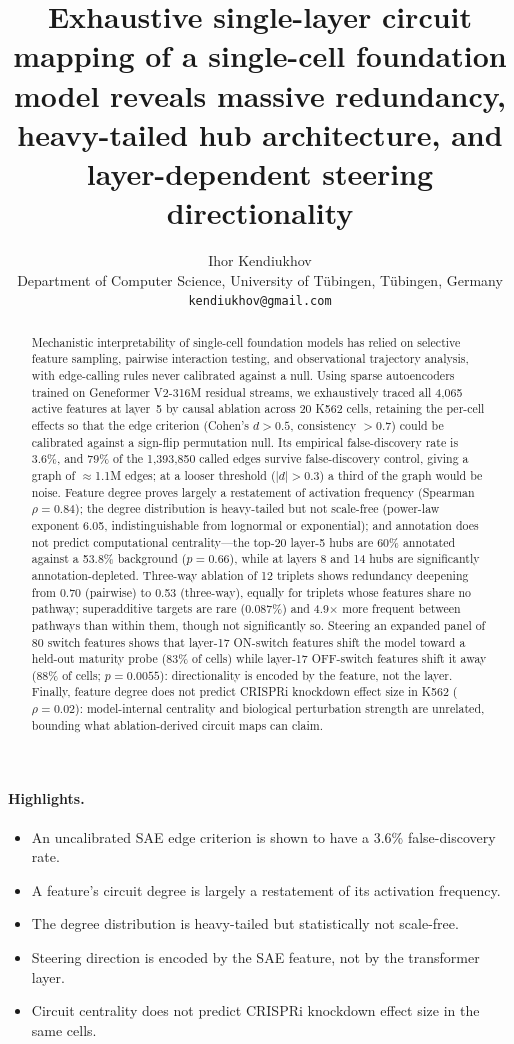 \documentclass[11pt,onecolumn]{article}
\title{Exhaustive single-layer circuit mapping of a single-cell foundation model reveals massive redundancy, heavy-tailed hub architecture, and layer-dependent steering directionality}
\author{Ihor Kendiukhov\\ Department of Computer Science, University of T\"ubingen, T\"ubingen, Germany\\ \texttt{kendiukhov@gmail.com}}
\date{}
\begin{document}
\maketitle

\begin{abstract}
Mechanistic interpretability of single-cell foundation models has relied on selective feature sampling, pairwise interaction testing, and observational trajectory analysis, with edge-calling rules never calibrated against a null. Using sparse autoencoders trained on Geneformer V2-316M residual streams, we exhaustively traced all 4{,}065 active features at layer~5 by causal ablation across 20 K562 cells, retaining the per-cell effects so that the edge criterion (Cohen's $d>0.5$, consistency $>0.7$) could be calibrated against a sign-flip permutation null. Its empirical false-discovery rate is 3.6\%, and 79\% of the 1{,}393{,}850 called edges survive false-discovery control, giving a graph of $\approx$1.1M edges; at a looser threshold ($|d|>0.3$) a third of the graph would be noise. Feature degree proves largely a restatement of activation frequency (Spearman $\rho=0.84$); the degree distribution is heavy-tailed but not scale-free (power-law exponent 6.05, indistinguishable from lognormal or exponential); and annotation does not predict computational centrality---the top-20 layer-5 hubs are 60\% annotated against a 53.8\% background ($p=0.66$), while at layers 8 and 14 hubs are significantly annotation-depleted. Three-way ablation of 12 triplets shows redundancy deepening from 0.70 (pairwise) to 0.53 (three-way), equally for triplets whose features share no pathway; superadditive targets are rare (0.087\%) and 4.9$\times$ more frequent between pathways than within them, though not significantly so. Steering an expanded panel of 80 switch features shows that layer-17 ON-switch features shift the model toward a held-out maturity probe (83\% of cells) while layer-17 OFF-switch features shift it away (88\% of cells; $p=0.0055$): directionality is encoded by the feature, not the layer. Finally, feature degree does not predict CRISPRi knockdown effect size in K562 ($\rho=0.02$): model-internal centrality and biological perturbation strength are unrelated, bounding what ablation-derived circuit maps can claim.
\end{abstract}

\paragraph{Highlights.}
\begin{itemize}
\item An uncalibrated SAE edge criterion is shown to have a 3.6\% false-discovery rate.
\item A feature's circuit degree is largely a restatement of its activation frequency.
\item The degree distribution is heavy-tailed but statistically not scale-free.
\item Steering direction is encoded by the SAE feature, not by the transformer layer.
\item Circuit centrality does not predict CRISPRi knockdown effect size in the same cells.
\end{itemize}
\end{document}
